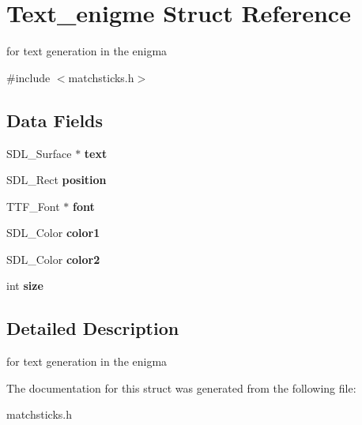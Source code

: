 \hypertarget{structText__enigme}{}\section{Text\+\_\+enigme Struct Reference}
\label{structText__enigme}


for text generation in the enigma  




{\ttfamily \#include $<$matchsticks.\+h$>$}

\subsection*{Data Fields}
\begin{DoxyCompactItemize}
\item 
\mbox{\label{structText__enigme_a8e53db4f6d572ee05a3a5394c0b39885}} 
S\+D\+L\+\_\+\+Surface $\ast$ {\bfseries text}
\item 
\mbox{\label{structText__enigme_a1014666a5119f333087f45987558a380}} 
S\+D\+L\+\_\+\+Rect {\bfseries position}
\item 
\mbox{\label{structText__enigme_aa6db3ad23e6a0b80e973cfdd4f8c45a7}} 
T\+T\+F\+\_\+\+Font $\ast$ {\bfseries font}
\item 
\mbox{\label{structText__enigme_a281b95feb122066eedf8fd62bf728070}} 
S\+D\+L\+\_\+\+Color {\bfseries color1}
\item 
\mbox{\label{structText__enigme_a0134c22d777c58b8025445de627e5b16}} 
S\+D\+L\+\_\+\+Color {\bfseries color2}
\item 
\mbox{\label{structText__enigme_a716eb1e88e41e1679ee0b94c89f2b861}} 
int {\bfseries size}
\end{DoxyCompactItemize}


\subsection{Detailed Description}
for text generation in the enigma 

The documentation for this struct was generated from the following file\+:\begin{DoxyCompactItemize}
\item 
matchsticks.\+h\end{DoxyCompactItemize}
